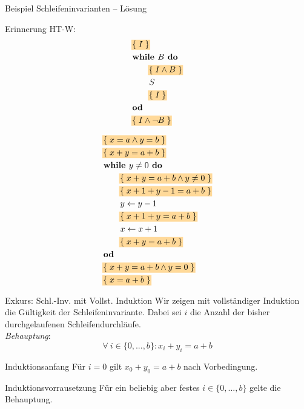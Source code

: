 \begin{frame}{Beispiel Schleifeninvarianten – Lösung}
	\begin{minipage}{.4\linewidth}
		Erinnerung HT-W:
		\vspace{-.4\baselineskip}
		\begin{align*}
		&\assert{I}  \\
		&\kw{while } B \kw{ do } \\
		&\qquad \assert{I \land B} \\
		&\qquad S \\
		&\qquad \assert{I} \\
		&\kw{od} \\
		&\assert{I \land \lnot B}
		\end{align*}
	\end{minipage}
	\begin{minipage}{.4\linewidth}
		\begin{align*}
		&\assert{x=a \land y=b }  \\
		&\assert{ x+y=a+b }  \\
		&\kw{while } y\not=0 \kw{ do } \\
		&\qquad\assert{x+y=a+b \land y\not=0 }  \\
		&\qquad\assert{x+1+y-1=a+b } \\
		&\qquad y \gets y-1 \\
		&\qquad\assert{x+1+y = a+b} \\
		&\qquad x \gets x+1 \\
		&\qquad\assert{ x+y = a+b} \\
		&\kw{od } \\
		&\assert{ x+y = a+b \land y=0 } \\
		&\assert{x=a+b} \\
		\end{align*}
	\end{minipage}
	
\end{frame}

\begin{frame}{Exkurs: Schl.-Inv. mit Vollst. Induktion}
	Wir zeigen mit vollständiger Induktion die Gültigkeit der Schleifeninvariante. Dabei sei $i$ die Anzahl der bisher durchgelaufenen Schleifendurchläufe.\\
	
	\emph{Behauptung}: $$ \forall\ i \in \{0,...,b\} : x_i + y_i = a+b $$ \pause
	\begin{block}{Induktionsanfang}
		Für $i=0$ gilt $ x_0+y_0 = a+b $ nach Vorbedingung.
	\end{block} \pause 
	\begin{block}{Induktionsvorrausetzung}
		Für ein beliebig aber festes $i\in \{0,...,b\}$ gelte die Behauptung.
	\end{block}
\end{frame}

